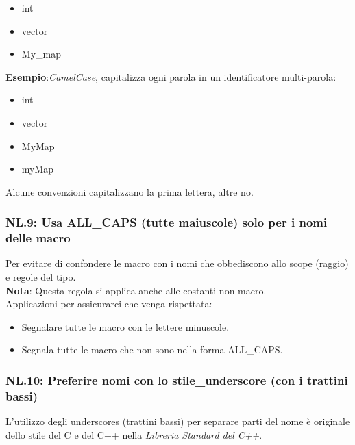 \begin{itemize}
	\item \textsf{\small int}
	\item \textsf{\small vector}
	\item \textsf{\small My\_map}
\end{itemize}

\textsf{\small \textbf{Esempio}:\emph{CamelCase}, capitalizza ogni parola in un identificatore multi-parola: }

\begin{itemize}
	\item \textsf{\small int}
	\item \textsf{\small vector}
	\item \textsf{\small MyMap}
	\item \textsf{\small myMap}
\end{itemize}

\textsf{\small Alcune convenzioni capitalizzano la prima lettera, altre no.} \\

\subsubsection{NL.9: Usa ALL\_CAPS (tutte maiuscole) solo per i nomi delle macro}

\textsf{\small Per evitare di confondere le macro con i nomi che obbediscono allo scope (raggio) e regole del tipo.} \\

\textsf{\small \textbf{Nota}: Questa regola si applica anche alle costanti non-macro.} \\

\textsf{\small Applicazioni per assicurarci che venga rispettata: } 

\begin{itemize}
	\item \textsf{\small Segnalare tutte le macro con le lettere minuscole.}
	\item \textsf{\small Segnala tutte le macro che non sono nella forma ALL\_CAPS.}
\end{itemize}

\subsubsection{NL.10: Preferire nomi con lo stile\_underscore (con i trattini bassi)}

\textsf{\small L'utilizzo degli underscores (trattini bassi) per separare parti del nome è originale dello stile del C e del C++ nella \emph{Libreria Standard del C++}.} \\


